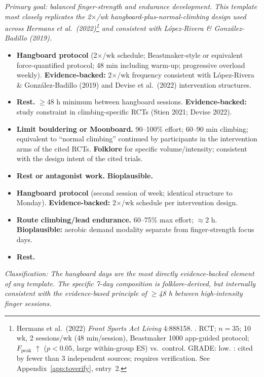 \noindent\textit{Primary goal: balanced finger-strength and endurance development. This template most closely replicates the 2$\times$/wk hangboard-plus-normal-climbing design used across Hermans et al.\ (2022)\footnote{Hermans et al.\ (2022) \textit{Front Sports Act Living} 4:888158. \cite{HO22}. RCT; $n = 35$; 10 wk, 2 sessions/wk (48 min/session), Beastmaker 1000 app-guided protocol; $F_\mathrm{peak}$ $\uparrow$ ($p < 0.05$, large within-group ES) vs.\ control. GRADE: low. \toverify: cited by fewer than 3 independent sources; requires verification. See Appendix~\ref{app:toverify}, entry~2.} and consistent with López-Rivera \& González-Badillo (2019).}

\begin{itemize}[leftmargin=1.6cm,labelwidth=1.2cm,align=left]
  \item[\textbf{Mon:}] \textbf{Hangboard protocol} (2$\times$/wk schedule; Beastmaker-style or equivalent force-quantified protocol; 48 min including warm-up; progressive overload weekly). \textbf{Evidence-backed:} 2$\times$/wk frequency consistent with López-Rivera \& González-Badillo (2019) and Devise et al.\ (2022) intervention structures.
  \item[\textbf{Tue:}] \textbf{Rest.} $\geq$48 h minimum between hangboard sessions. \textbf{Evidence-backed:} study constraint in climbing-specific RCTs (Stien 2021; Devise 2022).
  \item[\textbf{Wed:}] \textbf{Limit bouldering or Moonboard.} 90–100\% effort; 60–90 min climbing; equivalent to ``normal climbing'' continued by participants in the intervention arms of the cited RCTs. \textbf{Folklore} for specific volume/intensity; consistent with the design intent of the cited trials.
  \item[\textbf{Thu:}] \textbf{Rest or antagonist work.} \textbf{Bioplausible.}
  \item[\textbf{Fri:}] \textbf{Hangboard protocol} (second session of week; identical structure to Monday). \textbf{Evidence-backed:} 2$\times$/wk schedule per intervention design.
  \item[\textbf{Sat:}] \textbf{Route climbing/lead endurance.} 60–75\% max effort; $\approx$2 h. \textbf{Bioplausible:} aerobic demand modality separate from finger-strength focus days.
  \item[\textbf{Sun:}] \textbf{Rest.}
\end{itemize}

\noindent\textit{Classification: The hangboard days are the most directly evidence-backed element of any template. The specific 7-day composition is folklore-derived, but internally consistent with the evidence-based principle of $\geq$48 h between high-intensity finger sessions.}

